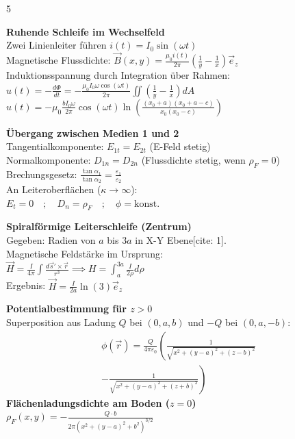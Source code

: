 \documentclass[a4paper, 2pt, landscape]{extarticle}
\begin{document}
\begin{multicols*}{5}
\begin{tcolorbox}[title={Induktion: Zeitveränderliches Feld (Blatt 8)}, colback=white, colframe=black]
\textbf{Ruhende Schleife im Wechselfeld} \\
Zwei Linienleiter führen $i(t) = I_0 \sin(\omega t)$ \\
Magnetische Flussdichte: $\vec{B}(x,y) = \frac{\mu_0 i(t)}{2\pi} (\frac{1}{y} - \frac{1}{x}) \vec{e}_z$ \\
Induktionsspannung durch Integration über Rahmen: \\
$u(t) = -\frac{d\Phi}{dt} = -\frac{\mu_0 I_0 \omega \cos(\omega t)}{2\pi} \iint (\frac{1}{y} - \frac{1}{x}) dA$\\
$u(t) = -\mu_0 \frac{b I_0 \omega}{2\pi} \cos(\omega t) \ln\left( \frac{(x_0+a)(x_0+a-c)}{x_0(x_0-c)} \right)$
\end{tcolorbox}

\begin{tcolorbox}[title={Grenzbedingungen: Feldbrechung (Blatt 3)}, colback=white, colframe=black]
\textbf{Übergang zwischen Medien 1 und 2} \\
Tangentialkomponente: $E_{1t} = E_{2t}$ (E-Feld stetig) \\
Normalkomponente: $D_{1n} = D_{2n}$ (Flussdichte stetig, wenn $\rho_F = 0$) \\
Brechungsgesetz: $\frac{\tan \alpha_1}{\tan \alpha_2} = \frac{\varepsilon_1}{\varepsilon_2}$ \\
An Leiteroberflächen ($\kappa \to \infty$): \\
$E_t = 0 \quad ; \quad D_n = \rho_F \quad ; \quad \phi = \text{konst.}$
\end{tcolorbox}

\begin{tcolorbox}[title={Magnetostatik: Biot-Savart Spirale (Blatt 8)}, colback=white, colframe=black]
\textbf{Spiralförmige Leiterschleife (Zentrum)} \\
Gegeben: Radien von $a$ bis $3a$ in X-Y Ebene[cite: 1]. \\
Magnetische Feldstärke im Ursprung: \\
$\vec{H} = \frac{I}{4\pi} \int \frac{d\vec{s}' \times \vec{r}}{r^3} \implies H = \int_a^{3a} \frac{I}{2 \rho} d\rho$\\
Ergebnis: $\vec{H} = \frac{I}{2a} \ln(3) \vec{e}_z$
\end{tcolorbox}

\begin{tcolorbox}[title={Spiegelung: Punktladung über geerdeter Ebene (Blatt 4)}, colback=white, colframe=black]
\textbf{Potentialbestimmung für $z > 0$} \\
Superposition aus Ladung $Q$ bei $(0, a, b)$ und $-Q$ bei $(0, a, -b)$:
\begin{gather*}
\phi(\vec{r}) = \frac{Q}{4\pi\varepsilon_0} \left( \frac{1}{\sqrt{x^2 + (y-a)^2 + (z-b)^2}} \right. \\
\left. - \frac{1}{\sqrt{x^2 + (y-a)^2 + (z+b)^2}} \right)
\end{gather*}
\textbf{Flächenladungsdichte am Boden ($z=0$)} \\
$\rho_F(x, y) = -\frac{Q \cdot b}{2\pi (x^2 + (y-a)^2 + b^2)^{3/2}}$
\end{tcolorbox}


\end{multicols*}
\end{document}
